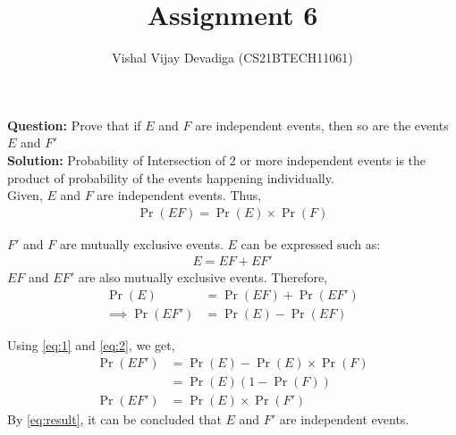 \documentclass[journal,12pt,twocolumn]{IEEEtran}
\title{Assignment 6}
\author{Vishal Vijay Devadiga (CS21BTECH11061)}
\date{}
\providecommand{\pr}[1]{\ensuremath{\Pr\left(#1\right)}}
\providecommand{\brak}[1]{\ensuremath{\left(#1\right)}}
\newcommand{\question}{\noindent \textbf{Question: }}
\newcommand{\solution}{\noindent \textbf{Solution: }}
\begin{document}
\maketitle

\question
Prove that if $E$ and $F$ are independent events, then so are the events $E$ and $F'$ \\
\solution
Probability of Intersection of 2 or more independent events is the product of probability of the events happening individually. \\
Given, $E$ and $F$ are independent events. Thus,
\begin{align}
	\label{eq:1}
	\pr{E F} = \pr{E} \times \pr{F}
\end{align}

$F'$ and $F$ are mutually exclusive events. $E$ can be expressed such as:
\begin{align}
	E = EF + EF'
\end{align}
$EF$ and $EF'$ are also mutually exclusive events. Therefore,
\begin{align}
	\pr{E}            & = \pr{EF} + \pr{EF'}
	\\
	\label{eq:2}
	\implies \pr{EF'} & = \pr{E} - \pr{EF}
\end{align}


Using \eqref{eq:1} and \eqref{eq:2}, we get,
\begin{align}
	\pr{EF'} & = \pr{E} - \pr{E} \times \pr{F}
	\\
	         & = \pr{E}\brak{1 - \pr{F}}
	\\
	\label{eq:result}
	\pr{EF'} & = \pr{E} \times \pr{F'}
\end{align}
By \eqref{eq:result}, it can be concluded that $E$ and $F'$ are independent events.

\end{document}
